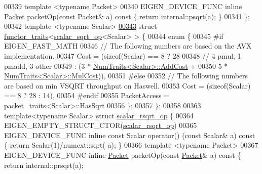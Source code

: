 \begin{DoxyCode}
00339   \textcolor{keyword}{template} <\textcolor{keyword}{typename} Packet>
00340   EIGEN\_DEVICE\_FUNC \textcolor{keyword}{inline} \hyperlink{union_eigen_1_1internal_1_1_packet}{Packet} packetOp(\textcolor{keyword}{const} \hyperlink{union_eigen_1_1internal_1_1_packet}{Packet}& a)\textcolor{keyword}{ const }\{ \textcolor{keywordflow}{return} internal::psqrt(a); 
      \}
00341 \};
00342 \textcolor{keyword}{template} <\textcolor{keyword}{typename} Scalar>
\hyperlink{struct_eigen_1_1internal_1_1functor__traits_3_01scalar__sqrt__op_3_01_scalar_01_4_01_4}{00343} \textcolor{keyword}{struct }\hyperlink{struct_eigen_1_1internal_1_1functor__traits}{functor\_traits}<\hyperlink{struct_eigen_1_1internal_1_1scalar__sqrt__op}{scalar\_sqrt\_op}<Scalar> > \{
00344   \textcolor{keyword}{enum} \{
00345 \textcolor{preprocessor}{#if EIGEN\_FAST\_MATH}
00346     \textcolor{comment}{// The following numbers are based on the AVX implementation.}
00347     Cost = (\textcolor{keyword}{sizeof}(Scalar) == 8 ? 28
00348                                 \textcolor{comment}{// 4 pmul, 1 pmadd, 3 other}
00349                                 : (3 * \hyperlink{group___core___module_struct_eigen_1_1_num_traits}{NumTraits<Scalar>::AddCost} +
00350                                    5 * \hyperlink{group___core___module_struct_eigen_1_1_num_traits}{NumTraits<Scalar>::MulCost})),
00351 #\textcolor{keywordflow}{else}
00352     \textcolor{comment}{// The following numbers are based on min VSQRT throughput on Haswell.}
00353     Cost = (\textcolor{keyword}{sizeof}(Scalar) == 8 ? 28 : 14),
00354 #endif
00355     PacketAccess = \hyperlink{struct_eigen_1_1internal_1_1packet__traits}{packet\_traits<Scalar>::HasSqrt}
00356   \};
00357 \};
00358 
\hyperlink{struct_eigen_1_1internal_1_1scalar__rsqrt__op}{00363} \textcolor{keyword}{template}<\textcolor{keyword}{typename} Scalar> \textcolor{keyword}{struct }\hyperlink{struct_eigen_1_1internal_1_1scalar__rsqrt__op}{scalar\_rsqrt\_op} \{
00364   EIGEN\_EMPTY\_STRUCT\_CTOR(\hyperlink{struct_eigen_1_1internal_1_1scalar__rsqrt__op}{scalar\_rsqrt\_op})
00365   EIGEN\_DEVICE\_FUNC \textcolor{keyword}{inline} \textcolor{keyword}{const} Scalar operator() (\textcolor{keyword}{const} Scalar& a)\textcolor{keyword}{ const }\{ \textcolor{keywordflow}{return} Scalar(1)/numext::sqrt(
      a); \}
00366   \textcolor{keyword}{template} <\textcolor{keyword}{typename} Packet>
00367   EIGEN\_DEVICE\_FUNC \textcolor{keyword}{inline} \hyperlink{union_eigen_1_1internal_1_1_packet}{Packet} packetOp(\textcolor{keyword}{const} \hyperlink{union_eigen_1_1internal_1_1_packet}{Packet}& a)\textcolor{keyword}{ const }\{ \textcolor{keywordflow}{return} internal::prsqrt(a);

\end{DoxyCode}
